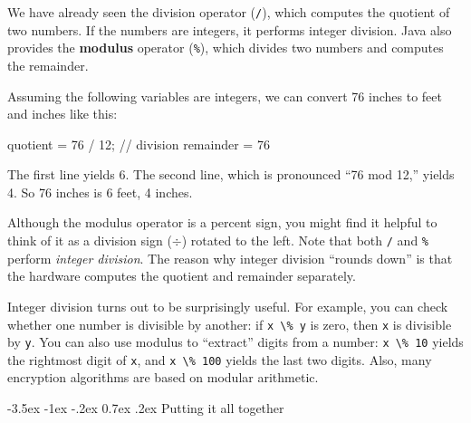 \documentclass[12pt]{book}
\makeatletter
\renewcommand{\section}{\@startsection {section}{1}{\z@}%
    {-3.5ex \@plus -1ex \@minus -.2ex}%
    {0.7ex \@plus.2ex}%
    {\normalfont\Large\bfseries}}
\theoremstyle{exercise}
\newcommand{\java}[1]{\lstinline{#1}} %
\makeatother
\begin{document}
We have already seen the division operator ({\tt /}), which computes the quotient of two numbers.
If the numbers are integers, it performs integer division.
Java also provides the {\bf modulus} operator ({\tt \%}), which divides two numbers and computes the remainder.

Assuming the following variables are integers, we can convert 76 inches to feet and inches like this:

\begin{code}
    quotient = 76 / 12;   // division
    remainder = 76 %
\end{code}

The first line yields 6.
The second line, which is pronounced ``76 mod 12,'' yields 4.
So 76 inches is 6 feet, 4 inches.

Although the modulus operator is a percent sign, you might find it helpful to think of it as a division sign ($\div$) rotated to the left.
Note that both {\tt /} and {\tt \%} perform {\em integer division}.
The reason why integer division ``rounds down'' is that the hardware computes the quotient and remainder separately.


Integer division turns out to be surprisingly useful.
For example, you can check whether one number is divisible by another: if \java{x \% y} is zero, then \java{x} is divisible by \java{y}.
You can also use modulus to ``extract'' digits from a number: \java{x \% 10} yields the rightmost digit of \java{x}, and \java{x \% 100} yields the last two digits.
Also, many encryption algorithms are based on modular arithmetic.


\section{Putting it all together}



\end{document}
